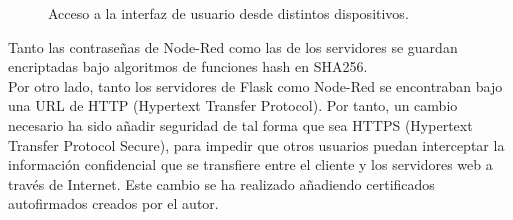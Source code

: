 \begin{figure}[h!]
  \begin{center}
    \hspace{2mm}
  \end{center}
\caption{Acceso a la interfaz de usuario desde distintos dispositivos.} \label{fig:userlogin}
\end{figure}

Tanto las contraseñas de Node-Red como las de los servidores se guardan encriptadas bajo algoritmos de funciones hash en SHA256.\\

Por otro lado, tanto los servidores de Flask como Node-Red se encontraban bajo una URL de HTTP (Hypertext Transfer Protocol). Por tanto, un cambio necesario ha sido añadir seguridad de tal forma que sea HTTPS (Hypertext Transfer Protocol Secure), para impedir que otros usuarios puedan interceptar la información confidencial que se transfiere entre el cliente y los servidores web a través de Internet. Este cambio se ha realizado añadiendo certificados autofirmados creados por el autor.\\

